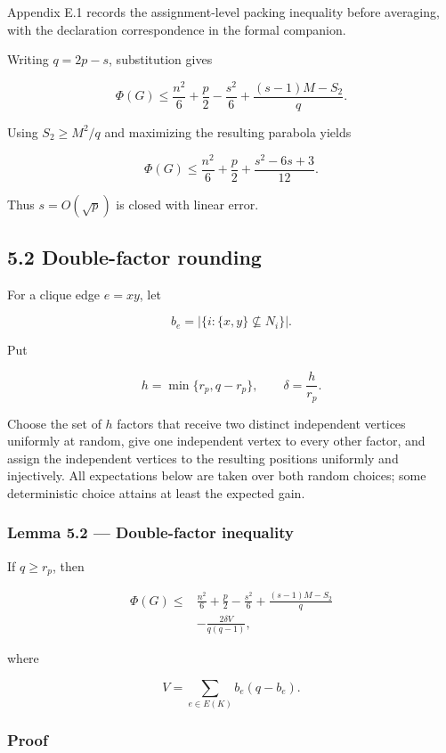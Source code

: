 \documentclass[english,11pt,a4paper]{article}
\begin{document}
Appendix E.1 records the assignment-level packing inequality before
averaging, with the declaration correspondence in the formal companion.

Writing \(q=2p-s\), substitution gives

\[
\Phi(G)
\le
\frac{n^2}{6}+\frac p2-\frac{s^2}{6}
+
\frac{(s-1)M-S_2}{q}.
\tag{5.2}
\]

Using \(S_2\ge M^2/q\) and maximizing the resulting parabola yields

\[
\boxed{
\Phi(G)
\le
\frac{n^2}{6}+\frac p2+\frac{s^2-6s+3}{12}
}.
\tag{5.3}
\]

Thus \(s=O(\sqrt p)\) is closed with linear error.

\subsection{5.2 Double-factor rounding}\label{double-factor-rounding}

For a clique edge \(e=xy\), let

\[
b_e=|\{i:\{x,y\}\not\subseteq N_i\}|.
\]

Put

\[
h=\min\{r_p,q-r_p\},
\qquad
\delta=\frac h{r_p}.
\]

Choose the set of \(h\) factors that receive two distinct independent
vertices uniformly at random, give one independent vertex to every other
factor, and assign the independent vertices to the resulting positions
uniformly and injectively. All expectations below are taken over both
random choices; some deterministic choice attains at least the expected
gain.

\subsubsection{Lemma 5.2 --- Double-factor
inequality}\label{lemma-5.2-double-factor-inequality}

If \(q\ge r_p\), then

\[
\boxed{
\begin{aligned}
\Phi(G)
\le{}&
\frac{n^2}{6}+\frac p2-\frac{s^2}{6}
+
\frac{(s-1)M-S_2}{q}\\
&-
\frac{2\delta V}{q(q-1)},
\end{aligned}
}
\tag{5.4}
\]

where

\[
V=\sum_{e\in E(K)}b_e(q-b_e).
\tag{5.5}
\]

\subsubsection{Proof}\label{proof-4}
\end{document}
